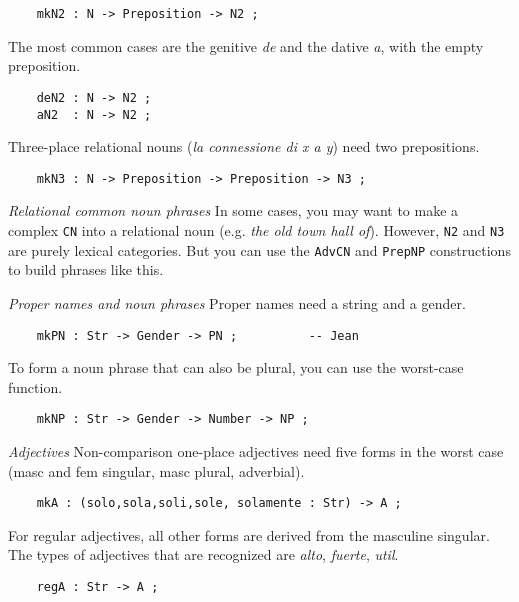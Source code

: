 \documentclass[11pt,a4paper]{article}
\newcommand{\subsubsubsection}[1]{\textit{#1}}
\begin{document}
\begin{verbatim}
    mkN2 : N -> Preposition -> N2 ;
\end{verbatim}

The most common cases are the genitive \textit{de} and the dative \textit{a}, 
with the empty preposition.

\begin{verbatim}
    deN2 : N -> N2 ;
    aN2  : N -> N2 ;
\end{verbatim}

Three-place relational nouns (\textit{la connessione di x a y}) need two prepositions.

\begin{verbatim}
    mkN3 : N -> Preposition -> Preposition -> N3 ;
\end{verbatim}

\subsubsubsection{Relational common noun phrases}
In some cases, you may want to make a complex \texttt{CN} into a
relational noun (e.g. \textit{the old town hall of}). However, \texttt{N2} and
\texttt{N3} are purely lexical categories. But you can use the \texttt{AdvCN}
and \texttt{PrepNP} constructions to build phrases like this.

\subsubsubsection{Proper names and noun phrases}
Proper names need a string and a gender.

\begin{verbatim}
    mkPN : Str -> Gender -> PN ;          -- Jean
\end{verbatim}

To form a noun phrase that can also be plural,
you can use the worst-case function.

\begin{verbatim}
    mkNP : Str -> Gender -> Number -> NP ; 
\end{verbatim}

\subsubsubsection{Adjectives}
Non-comparison one-place adjectives need five forms in the worst
case (masc and fem singular, masc plural, adverbial).

\begin{verbatim}
    mkA : (solo,sola,soli,sole, solamente : Str) -> A ;
\end{verbatim}

For regular adjectives, all other forms are derived from the
masculine singular. The types of adjectives that are recognized are
\textit{alto}, \textit{fuerte}, \textit{util}.

\begin{verbatim}
    regA : Str -> A ;
\end{verbatim}
\end{document}
